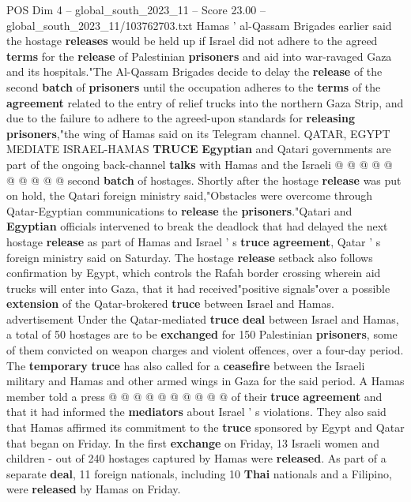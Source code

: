 \begin{textsample}{POS Dim 4 – global\_south\_2023\_11 – Score 23.00 – global\_south\_2023\_11/103762703.txt}
Hamas ' al-Qassam Brigades earlier said the hostage \textbf{releases} would be held up if Israel did not adhere to the agreed \textbf{terms} for the \textbf{release} of Palestinian \textbf{prisoners} and aid into war-ravaged Gaza and its hospitals."The Al-Qassam Brigades decide to delay the \textbf{release} of the second \textbf{batch} of \textbf{prisoners} until the occupation adheres to the \textbf{terms} of the \textbf{agreement} related to the entry of relief trucks into the northern Gaza Strip, and due to the failure to adhere to the agreed-upon standards for \textbf{releasing} \textbf{prisoners},"the wing of Hamas said on its Telegram channel.
QATAR, EGYPT MEDIATE ISRAEL-HAMAS \textbf{TRUCE} \textbf{Egyptian} and Qatari governments are part of the ongoing back-channel \textbf{talks} with Hamas and the Israeli @ @ @ @ @ @ @ @ @ @ second \textbf{batch} of hostages.
Shortly after the hostage \textbf{release} was put on hold, the Qatari foreign ministry said,"Obstacles were overcome through Qatar-Egyptian communications to \textbf{release} the \textbf{prisoners}."Qatari and \textbf{Egyptian} officials intervened to break the deadlock that had delayed the next hostage \textbf{release} as part of Hamas and Israel ' s \textbf{truce} \textbf{agreement}, Qatar ' s foreign ministry said on Saturday.
The hostage \textbf{release} setback also follows confirmation by Egypt, which controls the Rafah border crossing wherein aid trucks will enter into Gaza, that it had received"positive signals"over a possible \textbf{extension} of the Qatar-brokered \textbf{truce} between Israel and Hamas. advertisement Under the Qatar-mediated \textbf{truce} \textbf{deal} between Israel and Hamas, a total of 50 hostages are to be \textbf{exchanged} for 150 Palestinian \textbf{prisoners}, some of them convicted on weapon charges and violent offences, over a four-day period.
The \textbf{temporary} \textbf{truce} has also called for a \textbf{ceasefire} between the Israeli military and Hamas and other armed wings in Gaza for the said period.
A Hamas member told a press @ @ @ @ @ @ @ @ @ @ of their \textbf{truce} \textbf{agreement} and that it had informed the \textbf{mediators} about Israel ' s violations.
They also said that Hamas affirmed its commitment to the \textbf{truce} sponsored by Egypt and Qatar that began on Friday.
In the first \textbf{exchange} on Friday, 13 Israeli women and children - out of 240 hostages captured by Hamas were \textbf{released}.
As part of a separate \textbf{deal}, 11 foreign nationals, including 10 \textbf{Thai} nationals and a Filipino, were \textbf{released} by Hamas on Friday.

\end{textsample}
